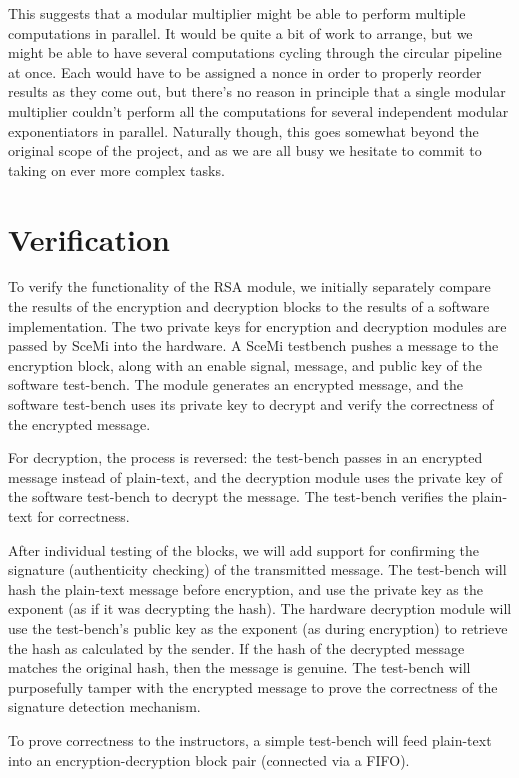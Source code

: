 \documentclass[12pt]{article}
\begin{document}
This suggests that a modular multiplier might be able to perform multiple computations in parallel.
It would be quite a bit of work to arrange,
but we might be able to have several computations cycling through the circular pipeline at once.
Each would have to be assigned a nonce in order to properly reorder results as they come out,
but there's no reason in principle that a single modular multiplier couldn't perform all the computations
for several independent modular exponentiators in parallel.
Naturally though, this goes somewhat beyond the original scope of the project,
and as we are all busy we hesitate to commit to taking on ever more complex tasks.

\section{Verification}
To verify the functionality of the RSA module, we initially separately 
compare the results of the encryption and decryption blocks to the results
of a software implementation. The two private keys for encryption and
decryption modules are passed by SceMi into the hardware. A SceMi testbench
pushes a message to the encryption block, along with an enable signal, message,
and public key of the software test-bench. The module generates an encrypted message,
and the software test-bench uses its private key to decrypt and verify the 
correctness of the encrypted message.

For decryption, the process is reversed: the test-bench passes in an 
encrypted message instead of plain-text, and the decryption module uses
the private key of the software test-bench to decrypt the message. The test-bench
verifies the plain-text for correctness.

After individual testing of the blocks, we will add support for confirming the signature
(authenticity checking) of the transmitted message. The test-bench will hash the plain-text
message before encryption, and use the private key as the exponent (as if it was decrypting
the hash). The hardware decryption module will use the test-bench's public key as the exponent
(as during encryption) to retrieve the hash as calculated by the sender. If the hash of the
decrypted message matches the original hash, then the message is genuine. The test-bench
will purposefully tamper with the encrypted message to prove the correctness of the 
signature detection mechanism. 

To prove correctness to the instructors, a simple test-bench will feed plain-text into an
encryption-decryption block pair (connected via a FIFO).
\end{document}

